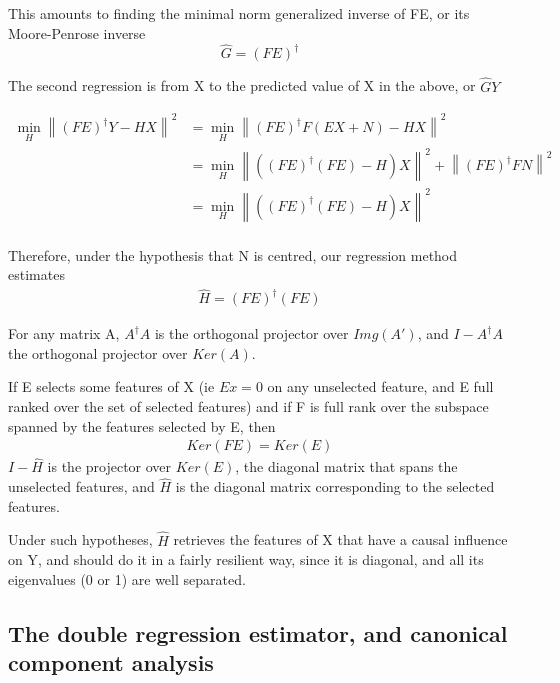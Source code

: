 \documentclass{article}
\begin{document}
This amounts to finding the minimal norm generalized inverse of FE, or its Moore-Penrose inverse
\begin{equation}
\hat  G= (FE)^{\dagger}
\end{equation}

The second regression is from X to the predicted value of X in the above, or $\hat G  Y$

\begin{equation}
\begin{aligned}
\min_H \left \| (FE)^{\dagger}Y - HX \right \|^2 &= \min_H \left \| (FE)^{\dagger}F(EX+N) - HX \right \|^2 \\
&= \min_H \left \| ((FE)^{\dagger}(FE)-H)X \right \| ^2 + \left \| (FE)^{\dagger}FN \right \| ^2\\
&= \min_H \left \| ((FE)^{\dagger}(FE)-H)X \right \| ^2\\
\end{aligned}
\end{equation}

Therefore, under the hypothesis that N is centred, our regression method estimates 
\begin{equation}
\begin{aligned}
\hat H =(FE)^{\dagger}(FE)
\end{aligned}
\end{equation}

For any matrix A, $A^\dagger A$ is the orthogonal projector over $Img(A')$, and $I-A^\dagger A$ the orthogonal projector over $Ker(A)$. 

If E selects some features of X (ie $Ex=0$ on any unselected feature, and E full ranked over the set of selected features) and if F is full rank over the subspace spanned by the features selected by E, then 
\begin{equation}
\begin{aligned}
Ker(FE) = Ker(E)  
\end{aligned}
\end{equation}
$I - \hat H$ is the projector over $Ker(E)$, the diagonal matrix that spans the unselected features, and $\hat H$ is the diagonal matrix corresponding to the selected features.

Under such hypotheses, $\hat H$ retrieves the features of X that have a causal influence on Y, and should do it in a fairly resilient way, since it is diagonal, and all its eigenvalues (0 or 1) are well separated.

\subsection{The double regression estimator, and canonical component analysis}
\end{document}
